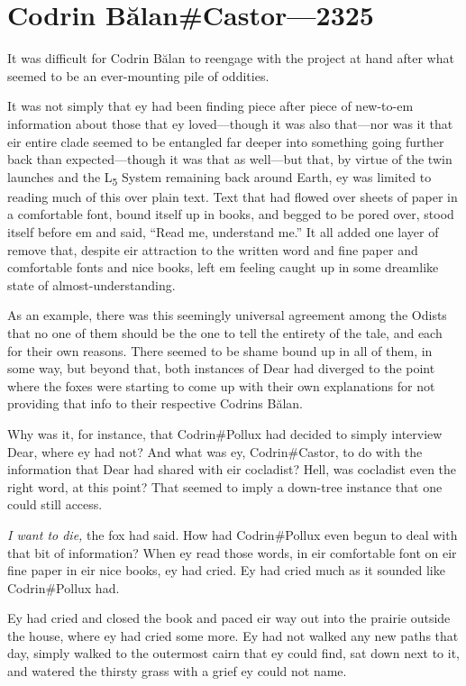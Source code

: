 \hypertarget{codrin-bux103lancastor-2325}{%
\chapter{Codrin Bălan\#Castor—2325}\label{codrin-bux103lancastor-2325}}

It was difficult for Codrin Bălan to reengage with the project at hand after what seemed to be an ever-mounting pile of oddities.

It was not simply that ey had been finding piece after piece of new-to-em information about those that ey loved---though it was also that---nor was it that eir entire clade seemed to be entangled far deeper into something going further back than expected---though it was that as well---but that, by virtue of the twin launches and the L\textsubscript{5} System remaining back around Earth, ey was limited to reading much of this over plain text. Text that had flowed over sheets of paper in a comfortable font, bound itself up in books, and begged to be pored over, stood itself before em and said, ``Read me, understand me.'' It all added one layer of remove that, despite eir attraction to the written word and fine paper and comfortable fonts and nice books, left em feeling caught up in some dreamlike state of almost-understanding.

As an example, there was this seemingly universal agreement among the Odists that no one of them should be the one to tell the entirety of the tale, and each for their own reasons. There seemed to be shame bound up in all of them, in some way, but beyond that, both instances of Dear had diverged to the point where the foxes were starting to come up with their own explanations for not providing that info to their respective Codrins Bălan.

Why was it, for instance, that Codrin\#Pollux had decided to simply interview Dear, where ey had not? And what was ey, Codrin\#Castor, to do with the information that Dear had shared with eir cocladist? Hell, was cocladist even the right word, at this point? That seemed to imply a down-tree instance that one could still access.

\emph{I want to die,} the fox had said. How had Codrin\#Pollux even begun to deal with that bit of information? When ey read those words, in eir comfortable font on eir fine paper in eir nice books, ey had cried. Ey had cried much as it sounded like Codrin\#Pollux had.

Ey had cried and closed the book and paced eir way out into the prairie outside the house, where ey had cried some more. Ey had not walked any new paths that day, simply walked to the outermost cairn that ey could find, sat down next to it, and watered the thirsty grass with a grief ey could not name.

